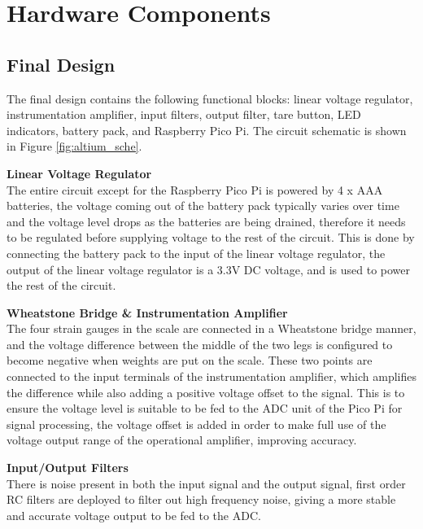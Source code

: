 
\chapter{Hardware Components}

\section{Final Design}
The final design contains the following functional blocks: linear voltage regulator, instrumentation amplifier, input filters, output filter, tare button, LED indicators, battery pack, and Raspberry Pico Pi. The circuit schematic is shown in Figure 
\ref{fig:altium_sche}.

\textbf{Linear Voltage Regulator}\\
The entire circuit except for the Raspberry Pico Pi is powered by 4 x AAA batteries, the voltage coming out of the battery pack typically varies over time and the voltage level drops as the batteries are being drained, therefore it needs to be regulated before supplying voltage to the rest of the circuit. This is done by connecting the battery pack to the input of the linear voltage regulator, the output of the linear voltage regulator is a 3.3V DC voltage, and is used to power the rest of the circuit.

\textbf{Wheatstone Bridge \& Instrumentation Amplifier}\\
The four strain gauges in the scale are connected in a Wheatstone bridge manner, and the voltage difference between the middle of the two legs is configured to become negative when weights are put on the scale. These two points are connected to the input terminals of the instrumentation amplifier, which amplifies the difference while also adding a positive voltage offset to the signal. This is to ensure the voltage level is suitable to be fed to the ADC unit of the Pico Pi for signal processing, the voltage offset is added in order to make full use of the voltage output range of the operational amplifier, improving accuracy.

\textbf{Input/Output Filters}\\
There is noise present in both the input signal and the output signal, first order RC filters are deployed to filter out high frequency noise, giving a more stable and accurate voltage output to be fed to the ADC.

